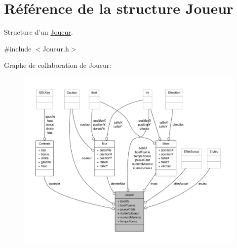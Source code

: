 \hypertarget{structJoueur}{\section{Référence de la structure Joueur}
\label{structJoueur}
}


Structure d'un \hyperlink{structJoueur}{Joueur}.  




{\ttfamily \#include $<$Joueur.\-h$>$}



Graphe de collaboration de Joueur\-:\nopagebreak
\begin{figure}[H]
\begin{center}
\leavevmode
\includegraphics[width=350pt]{structJoueur__coll__graph}
\end{center}
\end{figure}
